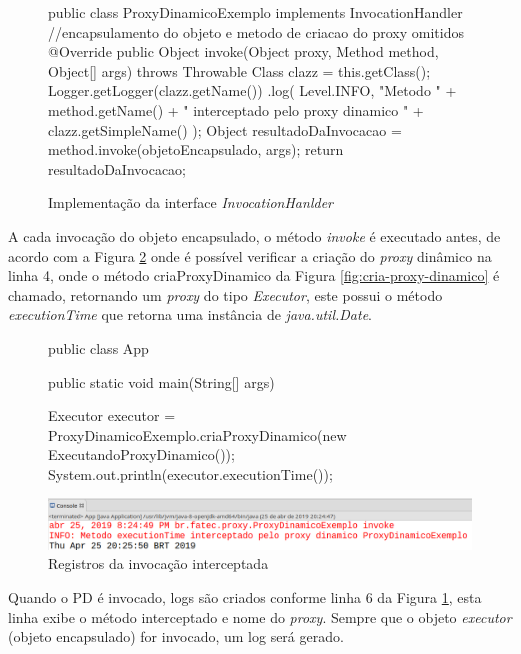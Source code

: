 \begin{figure}[H]
    \centering
    \caption{Implementação da interface \textit{InvocationHanlder}}
\begin{java}
public class ProxyDinamicoExemplo implements InvocationHandler {
//encapsulamento do objeto e metodo de criacao do proxy omitidos
	@Override
	public Object invoke(Object proxy, Method method, Object[] args) throws Throwable {
		Class clazz = this.getClass();
		Logger.getLogger(clazz.getName())
		    .log(
                        Level.INFO, "Metodo " +
                        method.getName() + 
                        " interceptado pelo proxy dinamico " +
                        clazz.getSimpleName()
		    );
		Object resultadoDaInvocacao = method.invoke(objetoEncapsulado, args);
		return resultadoDaInvocacao;
	}
}
\end{java}
    \label{fig:invoke-implementacao}
\end{figure}

\par A cada invocação do objeto encapsulado, o método \textit{invoke} é executado antes, de acordo com a Figura \ref{fig:invoke-registrando-log} onde é possível verificar a criação do \textit{proxy} dinâmico na linha 4, onde o método criaProxyDinamico da Figura \ref{fig:cria-proxy-dinamico} é chamado, retornando um \textit{proxy} do tipo \textit{Executor}, este possui o método \textit{executionTime} que retorna uma instância de \textit{java.util.Date}.

\begin{figure}[H]
    \centering
    \caption{Registros da invocação interceptada}
    \label{fig:invoke-registrando-log}
    \begin{java}
public class App {
	public static void main(String[] args) {
	
		Executor executor = ProxyDinamicoExemplo.criaProxyDinamico(new ExecutandoProxyDinamico());
		System.out.println(executor.executionTime());
	}
}
    \end{java}
    \includegraphics[scale=0.4]{src/imagens/cap2/invoke-registrando-log.png}
\end{figure}

Quando o PD é invocado, logs são criados conforme linha 6 da Figura \ref{fig:invoke-implementacao}, esta linha exibe o método interceptado e nome do \textit{proxy}. Sempre que o objeto \textit{executor} (objeto encapsulado) for invocado, um log será gerado.

